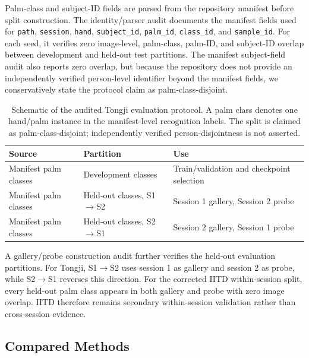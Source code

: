 

Palm-class and subject-ID fields are parsed from the repository manifest before split construction. The identity/parser audit documents the manifest fields used for \texttt{path}, \texttt{session}, \texttt{hand}, \texttt{subject\_id}, \texttt{palm\_id}, \texttt{class\_id}, and \texttt{sample\_id}. For each seed, it verifies zero image-level, palm-class, palm-ID, and subject-ID overlap between development and held-out test partitions. The manifest subject-field audit also reports zero overlap, but because the repository does not provide an independently verified person-level identifier beyond the manifest fields, we conservatively state the protocol claim as palm-class-disjoint.

\begin{table}[t]
\centering
\caption{Schematic of the audited Tongji evaluation protocol. A palm class denotes one hand/palm instance in the manifest-level recognition labels. The split is claimed as palm-class-disjoint; independently verified person-disjointness is not asserted.}
\label{tab:tongji_protocol_schematic}
\begin{tabular}{lll}
\toprule
Source & Partition & Use \\
\midrule
Manifest palm classes & Development classes & Train/validation and checkpoint selection \\
Manifest palm classes & Held-out classes, S1$\rightarrow$S2 & Session 1 gallery, Session 2 probe \\
Manifest palm classes & Held-out classes, S2$\rightarrow$S1 & Session 2 gallery, Session 1 probe \\
\bottomrule
\end{tabular}
\end{table}

A gallery/probe construction audit further verifies the held-out evaluation partitions. For Tongji, S1$\rightarrow$S2 uses session 1 as gallery and session 2 as probe, while S2$\rightarrow$S1 reverses this direction. For the corrected IITD within-session split, every held-out palm class appears in both gallery and probe with zero image overlap. IITD therefore remains secondary within-session validation rather than cross-session evidence.

\subsection{Compared Methods}

